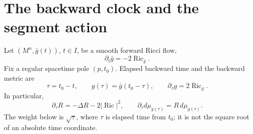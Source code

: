 \documentclass[10pt]{coll-l}
\theoremstyle{definition}
\theoremstyle{remark}
\numberwithin{section}{chapter}
\numberwithin{equation}{chapter}
\newcommand{\Ric}{\operatorname{Ric}}
\begin{document}
\section{The backward clock and the segment action}
\label{sec:red-clock}

Let $(M^n,\bar g(t))$, $t\in I$, be a smooth forward Ricci flow,
\begin{equation}
                         \partial_t\bar g=-2\Ric_{\bar g}.
                                                               \label{eq:red-forward-flow}
\end{equation}
Fix a regular spacetime pole $(p,t_0)$.  Elapsed backward time and the
backward metric are
\begin{equation}
       \tau=t_0-t,
       \qquad g(\tau)=\bar g(t_0-\tau),
       \qquad \partial_\tau g=2\Ric_g.                 \label{eq:red-backward-flow}
\end{equation}
In particular,
\begin{equation}
 \partial_\tau R=-\Delta R-2|\Ric|^2,
 \qquad
 \partial_\tau d\mu_{g(\tau)}=R\,d\mu_{g(\tau)}.       \label{eq:red-backward-basic-evolution}
\end{equation}
The weight below is $\sqrt\tau$, where $\tau$ is elapsed time from $t_0$;
it is not the square root of an absolute time coordinate.
\end{document}
